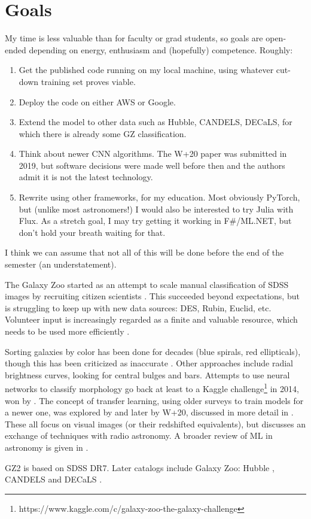 \documentclass[twocolumn, twocolappendix, tighten]{aastex631}
\begin{document}
\section{Goals}

My time is less valuable than for faculty or grad students, so goals are open-ended depending on energy, enthusiasm and (hopefully) competence. Roughly:
\begin{enumerate}
	\item Get the published code running on my local machine, using whatever cut-down training set proves viable.
	\item Deploy the code on either AWS or Google.
	\item Extend the model to other data such as Hubble, CANDELS, DECaLS, for which there is already some GZ classification.
	\item Think about newer CNN algorithms. The W+20 paper was submitted in 2019, but software decisions were made well before then and the authors admit it is not the latest technology.
	\item Rewrite using other frameworks, for my education. Most obviously PyTorch, but (unlike most astronomers!) I would also be interested to try Julia with Flux. As a stretch goal, I may try getting it working in F\#/ML.NET, but don't hold your breath waiting for that.
\end{enumerate}

I think we can assume that not all of this will be done before the end of the semester (an understatement).

\appendix


The Galaxy Zoo started as an attempt to scale manual classification of SDSS images by recruiting citizen scientists \citep{2008MNRAS.389.1179L}. This succeeded beyond expectations, but is struggling to keep up with new data sources: DES, Rubin, Euclid, etc. Volunteer input is increasingly regarded as a finite and valuable resource, which needs to be used more efficiently \citep{2020IAUS..341...99D}.

Sorting galaxies by color has been done for decades (blue spirals, red ellipticals), though this has been criticized as inaccurate \citep{smethurst_quantifying_2022}. Other approaches include radial brightness curves, looking for central bulges and bars. Attempts to use neural networks to classify morphology go back at least to a Kaggle challenge\footnote{https://www.kaggle.com/c/galaxy-zoo-the-galaxy-challenge} in 2014, won by \citet{2015MNRAS.450.1441D}. The concept of transfer learning, using older surveys to train models for a newer one, was explored by \citet{2019MNRAS.484...93D} and later by W+20, discussed in more detail in \citet{2021arXiv211012735W}. These all focus on visual images (or their redshifted equivalents), but \citet{2021arXiv211104353F} discusses an exchange of techniques with radio astronomy. A broader review of ML in astronomy is given in \citet{2020WDMKD..10.1349F}.

GZ2 \citep{willett_galaxy_2013, 2016MNRAS.461.3663H} is based on SDSS DR7. Later catalogs include Galaxy Zoo: Hubble \citep{2017MNRAS.464.4176W}, CANDELS \citep{2017MNRAS.464.4420S} and DECaLS \citep{walmsley_galaxy_2022}.



{}

\end{document}
